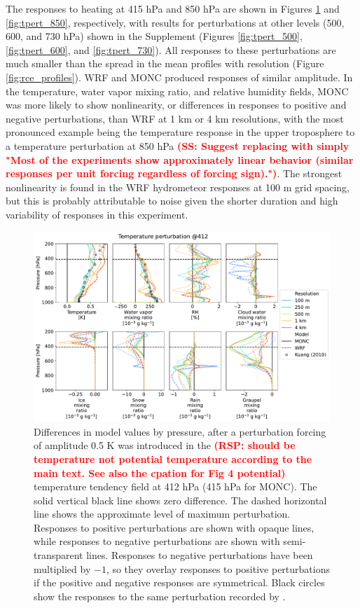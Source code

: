 \documentclass[draft]{agujournal2019}
\newcommand{\todo}[1]{\textcolor{red}{\textbf{(#1)}}}
\begin{document}
The responses to heating at 415 hPa
and 850 hPa are shown in Figures \ref{fig:tpert_412} and \ref{fig:tpert_850},
respectively, with results for perturbations at other levels (500, 600, and 730
hPa) shown in the Supplement (Figures \ref{fig:tpert_500}, \ref{fig:tpert_600},
and \ref{fig:tpert_730}). All responses to these perturbations are much smaller
than the spread in the mean profiles with resolution (Figure
\ref{fig:rce_profiles}). WRF and MONC produced responses of similar amplitude.
In the temperature, water vapor mixing ratio, and relative humidity fields, MONC
was more likely to show nonlinearity, or differences in responses to positive
and negative perturbations, than WRF at 1 km or 4 km resolutions, with the most
pronounced example being the temperature response in the upper troposphere to a
temperature perturbation at 850 hPa \todo{SS: Suggest replacing with simply "Most of the experiments show approximately linear behavior (similar responses per unit forcing regardless of forcing sign)."}. The strongest
nonlinearity is found in the WRF hydrometeor responses at 100 m grid spacing, but this is probably attributable to noise given the shorter duration and high variability of responses in this experiment.

\begin{figure}[pth]
    \noindent\includegraphics[width=\textwidth]{figures/pert_diffs_T_0.5_@412}
    \caption{Differences in model values by pressure, after a perturbation
    forcing of amplitude 0.5 K was introduced in the \todo{RSP: should be temperature not potential temperature according to the main text. See also the cpation for Fig 4 potential} temperature
    tendency field at 412 hPa (415 hPa for MONC). The solid vertical black line
    shows zero difference. The dashed horizontal line shows the approximate
    level of maximum perturbation. Responses to positive perturbations are shown
    with opaque lines, while responses to negative perturbations are shown with
    semi-transparent lines. Responses to negative perturbations have been
    multiplied by $-1$, so they overlay responses to positive perturbations if
    the positive and negative responses are symmetrical. Black circles show the
    responses to the same perturbation recorded by .}
    \label{fig:tpert_412}
\end{figure}
\end{document}
